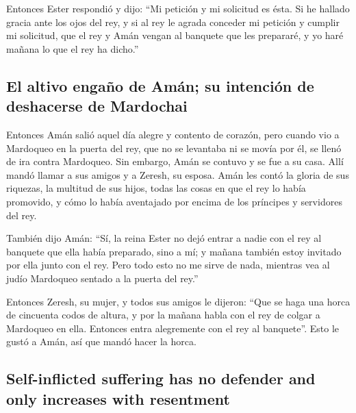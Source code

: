 \begin{paracol}{2}
 Entonces Ester respondió y dijo: ``Mi petición y mi
solicitud es ésta.  Si he hallado gracia ante los ojos del
rey, y si al rey le agrada conceder mi petición y cumplir mi solicitud,
que el rey y Amán vengan al banquete que les prepararé, y yo haré mañana
lo que el rey ha dicho.''

\hypertarget{el-altivo-engauxf1o-de-amuxe1n-su-intenciuxf3n-de-deshacerse-de-mardochai}{%
\subsection{El altivo engaño de Amán; su intención de deshacerse de
Mardochai}\label{el-altivo-engauxf1o-de-amuxe1n-su-intenciuxf3n-de-deshacerse-de-mardochai}}

 Entonces Amán salió aquel día alegre y contento de
corazón, pero cuando vio a Mardoqueo en la puerta del rey, que no se
levantaba ni se movía por él, se llenó de ira contra Mardoqueo.
 Sin embargo, Amán se contuvo y se fue a su casa. Allí
mandó llamar a sus amigos y a Zeresh, su esposa.  Amán
les contó la gloria de sus riquezas, la multitud de sus hijos, todas las
cosas en que el rey lo había promovido, y cómo lo había aventajado por
encima de los príncipes y servidores del rey.

 También dijo Amán: ``Sí, la reina Ester no dejó entrar a
nadie con el rey al banquete que ella había preparado, sino a mí; y
mañana también estoy invitado por ella junto con el rey. 
Pero todo esto no me sirve de nada, mientras vea al judío Mardoqueo
sentado a la puerta del rey.''

 Entonces Zeresh, su mujer, y todos sus amigos le
dijeron: ``Que se haga una horca de cincuenta codos de altura, y por la
mañana habla con el rey de colgar a Mardoqueo en ella. Entonces entra
alegremente con el rey al banquete''. Esto le gustó a Amán, así que
mandó hacer la horca.

\switchcolumn
\begin{otherlanguage}{english}

\hypertarget{self-inflicted-suffering-has-no-defender-and-only-increases-with-resentment}{%
\subsection{Self-inflicted suffering has no defender and only increases
with
resentment}\label{self-inflicted-suffering-has-no-defender-and-only-increases-with-resentment}}


\end{otherlanguage}
\end{paracol}
